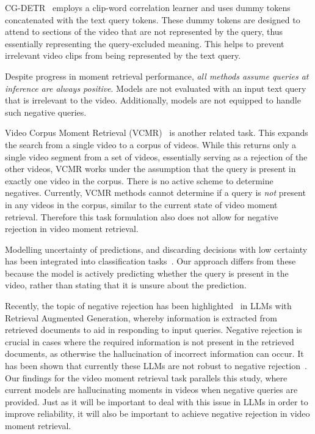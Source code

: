 CG-DETR~\cite{moon2024cgdetr} employs a clip-word correlation learner and uses dummy tokens concatenated with the text query tokens. These dummy tokens are designed to attend to sections of the video that are not represented by the query, thus essentially representing the query-excluded meaning. This helps to prevent irrelevant video clips from being represented by the text query.

Despite progress in moment retrieval performance, \emph{all methods assume queries at inference are always positive}. 
Models are not evaluated with an input text query that is irrelevant to the video. 
Additionally, models are not equipped to handle such negative queries.

Video Corpus Moment Retrieval (VCMR)~\cite{escorcia2019eemporallo, lei2020tvr, zhang2021video, hou2021conquer} is another related task. This expands the search from a single video to a corpus of videos. While this returns only a single video segment from a set of videos, essentially serving as a rejection of the other videos, VCMR works under the assumption that the query is present in exactly one video in the corpus. There is no active scheme to determine negatives. Currently, VCMR methods cannot determine if a query is \emph{not} present in any videos in the corpus, similar to the current state of video moment retrieval. Therefore this task formulation also does not allow for negative rejection in video moment retrieval.

Modelling uncertainty of predictions, and discarding decisions with low certainty has been integrated into classification tasks~\cite{pudil1992reject, radu2006reject, wiener2011agnosticsc, franc2023optimal}.
Our approach differs from these because the model is actively predicting whether the query is present in the video, rather than stating that it is unsure about the prediction.

Recently, the topic of negative rejection has been highlighted~\cite{chen2024benchmarking} in LLMs with Retrieval Augmented Generation, whereby information is extracted from retrieved documents to aid in responding to input queries. Negative rejection is crucial in cases where the required information is not present in the retrieved documents, as otherwise the hallucination of incorrect information can occur. It has been shown that currently these LLMs are not robust to negative rejection~\cite{chen2024benchmarking}. Our findings for the video moment retrieval task parallels this study, where current models are hallucinating moments in videos when negative queries are provided. Just as it will be important to deal with this issue in LLMs in order to improve reliability, it will also be important to achieve negative rejection in video moment retrieval.
